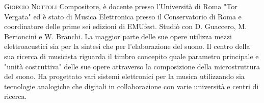 \documentclass[9pt, twoside, a5paper]{extreport}
\newcommand{\biografia}[2]{%
\noindent \textsc{#1} %
#2 %
\medskip
}%
\begin{document}
\begin{multicols}{2}

\biografia{Giorgio Nottoli}{Compositore, è docente presso l’Università di Roma "Tor Vergata" ed è stato di Musica Elettronica presso il Conservatorio di Roma e coordinatore delle prime sei edizioni di EMUfest. Studiò con D. Guaccero, M. Bertoncini e W. Branchi. La maggior parte delle sue opere utilizza mezzi elettroacustici sia per la sintesi che per l’elaborazione del suono. Il centro della sua ricerca di musicista riguarda il timbro concepito quale parametro principale e "unità costruttiva" delle sue opere attraverso la composizione della microstruttura del suono. Ha progettato vari sistemi elettronici per la musica utilizzando sia tecnologie analogiche che digitali in collaborazione con varie università e centri di ricerca.}


\end{multicols}
\end{document}
